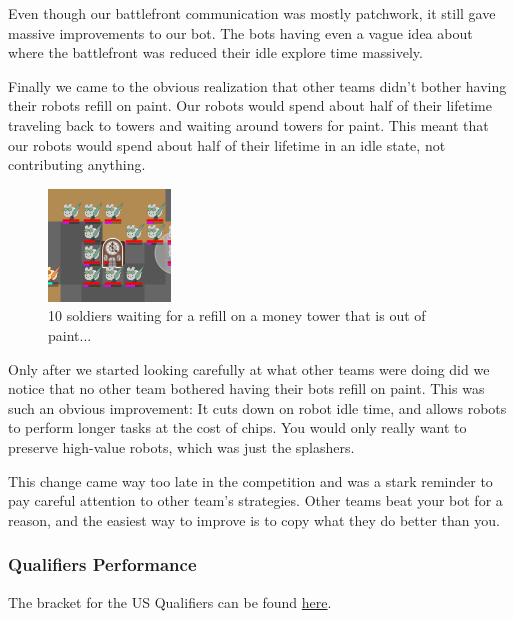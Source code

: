 \medskip

Even though our battlefront communication was mostly patchwork, it still gave massive improvements to our bot. The bots having even a vague idea about where the battlefront was reduced their idle explore time massively.

\medskip

Finally we came to the obvious realization that other teams didn't bother having their robots refill on paint. Our robots would spend about half of their lifetime traveling back to towers and waiting around towers for paint. This meant that our robots would spend about half of their lifetime in an idle state, not contributing anything.

\medskip

\begin{figure}[h]
    \centering
    \includegraphics[scale=1]{images/waiting_for_refill.png}
    \caption{10 soldiers waiting for a refill on a money tower that is out of paint...}
\end{figure}

Only after we started looking carefully at what other teams were doing did we notice that no other team bothered having their bots refill on paint. This was such an obvious improvement: It cuts down on robot idle time, and allows robots to perform longer tasks at the cost of chips. You would only really want to preserve high-value robots, which was just the splashers.

\medskip

This change came way too late in the competition and was a stark reminder to pay careful attention to other team's strategies. Other teams beat your bot for a reason, and the easiest way to improve is to copy what they do better than you.

\subsubsection{Qualifiers Performance}

The bracket for the US Qualifiers can be found \href{https://challonge.com/bc25javausquals}{here}.

\medskip

